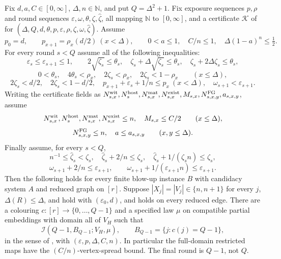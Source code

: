 \begin{lemma}
Fix $d,a,C\in[0,\infty]$, $\Delta,n\in\mathbb N$, and put $Q=\Delta^2+1$.
Fix exposure sequences $p,\rho$ and round sequences
$\varepsilon,\omega,\theta,\zeta,\widehat\zeta$, all mapping $\mathbb N$
to $[0,\infty]$, and a certificate $\mathcal K$ of
 for
$(\Delta,Q,d,\theta,p,\varepsilon,\rho,\zeta,\omega,\widehat\zeta)$.
Assume
\[
 p_0=d,\qquad p_{x+1}=\rho_x(d/2)\ (x<\Delta),\qquad
 0<a\leq1,\quad C/n\leq1,\quad \Delta(1-a)^n\leq\tfrac12.
\]
For every round $s<Q$ assume all of the following inequalities:
\[
 \varepsilon_s\leq\varepsilon_{s+1}\leq1,\qquad
 2\sqrt{\zeta_s}\leq\theta_s,\quad
 \zeta_s+\Delta\sqrt{\zeta_s}\leq\theta_s,\quad
 \zeta_s+2\Delta\zeta_s\leq\theta_s,
\]
\[
 0<\theta_s,\quad4\theta_s<\rho_x,\quad
 2\zeta_s<\rho_x,\quad2\zeta_s<1-\rho_x\qquad(x\leq\Delta),
\]
\[
 2\zeta_s<d/2,\quad2\zeta_s<1-d/2,\quad
 p_{x+1}+\varepsilon_s+1/n\leq p_x\ (x<\Delta),\quad
 \omega_{s+1}<\varepsilon_{s+1}.
\]
Writing the certificate fields as $N^{\rm wit}_{s,x},N^{\rm host}_s,
N^{\rm mat}_{s,x},N^{\rm exist}_{s,x},M_{s,x},
N^{\rm FG}_{s,x,y},a_{s,x,y}$, assume
\[
 N^{\rm wit}_{s,x},N^{\rm host}_s,N^{\rm mat}_{s,x},
 N^{\rm exist}_{s,x}\leq n,\quad M_{s,x}\leq C/2\qquad(x\leq\Delta),
\]
\[
 N^{\rm FG}_{s,x,y}\leq n,\quad a\leq a_{s,x,y}
 \qquad(x,y\leq\Delta).
\]
Finally assume, for every $s<Q$,
\[
 n^{-1}\leq\widehat\zeta_s<\zeta_s,\quad
 \widehat\zeta_s+2/n\leq\zeta_s,\quad
 \widehat\zeta_s+1/(\zeta_sn)\leq\zeta_s,
\]
\[
 \omega_{s+1}+2/n\leq\varepsilon_{s+1},\qquad
 \omega_{s+1}+1/(\varepsilon_{s+1}n)\leq\varepsilon_{s+1}.
\]
Then the following holds for every finite blow-up instance $B$ with
candidacy system $A$ and reduced graph on $[r]$. Suppose
$|X_j|=|V_j|\in\{n,n+1\}$ for every $j$, $\Delta(R)\leq\Delta$,
 and  hold
with $(\varepsilon_0,d)$, and  holds on
every reduced edge. There are a colouring $c:[r]\to\{0,\ldots,Q-1\}$
and a specified law $\mu$ on compatible partial embeddings with domain
all of $V_H$ such that
\[
 \mathcal I(Q-1,B_{Q-1};V_H,\mu),\qquad
 B_{Q-1}=\{j:c(j)=Q-1\},
\]
in the sense of , with
$(\varepsilon,p,\Delta,C,n)$. In particular the full-domain restricted
maps have the $(C/n)$-vertex-spread bound. The final round is $Q-1$,
not $Q$.
\end{lemma}

